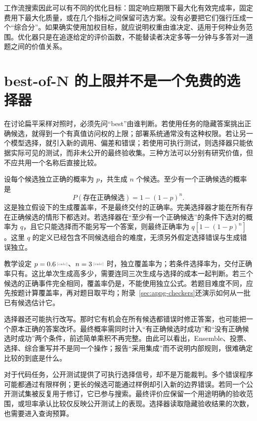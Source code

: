 工作流搜索因此可以有不同的优化目标：固定响应期限下最大化有效完成率，固定费用下最大化质量，或在几个指标之间保留可选方案。没有必要把它们强行压成一个“综合分”。如果确实使用加权目标，就应说明权重由谁决定、适用于何种业务范围。优化器只是在追逐给定的评价函数，不能替读者决定多等一分钟与多答对一道题之间的价值关系。

\section{best-of-N 的上限并不是一个免费的选择器}
\label{sec:ch09-selector}

在讨论扁平采样对照时，必须先问“best”由谁判断。若使用任务的隐藏答案挑出正确候选，就得到一个有真值访问权的上限；部署系统通常没有这种权限。若让另一个模型选择，就引入新的调用、偏差和错误；若使用可执行测试，则选择器只能依据实际可见的测试，而非未公开的最终验收集。三种方法可以分别有研究价值，但不应共用一个名称后直接比较。

设每个候选独立正确的概率为 $p$，共生成 $n$ 个候选。至少有一个正确候选的概率是
\begin{equation}
 P(\text{存在正确候选})=1-(1-p)^n.
 \label{eq:ch09-oracle}
\end{equation}
这是独立假设下的生成覆盖率，不是最终交付的正确率。完美选择器才能在所有存在正确候选的情形下都选对。若选择器在“至少有一个正确候选”的条件下选对的概率为 $q$，且它只能选择而不能另写一个答案，则最终正确率为 $q[1-(1-p)^n]$。这里 $q$ 的定义已经包含不同候选组合的难度，无须另外假定选择错误与生成错误独立。

教学设定 $p=\calcnum{0.6}$、$n=\calcnum{3}$ 时，独立覆盖率为；若条件选择率为，交付正确率只有。这比单次生成高多少，需要连同三次生成与选择的成本一起判断。若三个候选的正确事件完全相同，覆盖率仍是，不能使用独立公式。若题目难度不同，应先按题计算覆盖率，再对题目取平均；附录~\ref{sec:appg-checkers}还演示如何从一批已有候选估计它。

选择器还可能执行改写。那时它有机会在所有候选都错误时修正答案，也可能把一个原本正确的答案改坏。最终概率需同时计入“有正确候选时成功”和“没有正确候选时成功”两个条件，前述简单乘积不再完整。由此可以看出，Ensemble、投票、选择、综合重写并不是同一个操作；报告“采用集成”而不说明内部规则，很难确定比较的到底是什么。

对于代码任务，公开测试提供了可执行选择信号，却不是万能裁判。多个错误程序可能都通过有限样例；更长的候选可能通过样例却引入新的边界错误。若同一个公开测试集被反复用于修订，它已参与搜索。最终评价应保留一个用途明确的验收范围，或坦率承认比较仅反映公开测试上的表现。选择器读取隐藏验收结果的次数，也需要进入查询预算。

